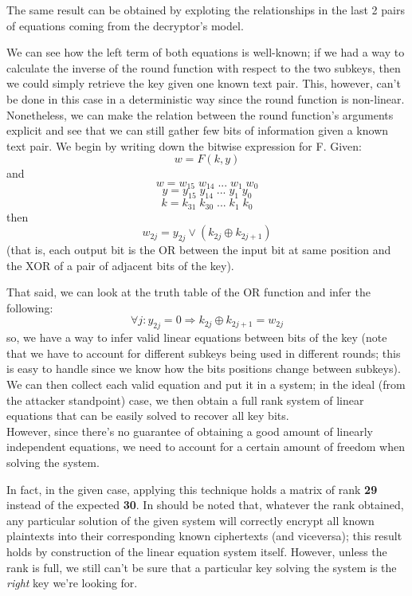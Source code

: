 \documentclass[a4paper,12pt,titlepage]{article}
\begin{document}
The same result can be obtained by exploting the relationships in the last 2
pairs of equations coming from the decryptor's model.

We can see how the left term of both equations is well-known; if we had a way
to calculate the inverse of the round function with respect to the two subkeys,
then we could simply retrieve the key given one known text pair. This, however,
can't be done in this case in a deterministic way since the round function is
non-linear. Nonetheless, we can make the relation between the round function's
arguments explicit and see that we can still gather few bits of information
given a known text pair. We begin by writing down the bitwise expression for F.
Given:
\[w = F(k, y)\]
and
\[w = w_{15} \; w_{14} \; ... \; w_1 \; w_0\]
\[y = y_{15} \; y_{14} \; ... \; y_1 \; y_0\]
\[k = k_{31} \; k_{30} \; ... \; k_1 \; k_0\]
then
\[w_{2j} = y_{2j} \vee (k_{2j} \oplus k_{2j+1})\]
(that is, each output bit is the OR between the input bit at same position and
the XOR of a pair of adjacent bits of the key).

That said, we can look at the truth table of the OR function and infer the
following:
\[\forall j : y_{2j} = 0 \Rightarrow k_{2j} \oplus k_{2j+1} = w_{2j}\]
so, we have a way to infer valid linear equations between bits of the key (note
that we have to account for different subkeys being used in different rounds;
this is easy to handle since we know how the bits positions change between
subkeys). \\
We can then collect each valid equation and put it in a system; in the ideal (from
the attacker standpoint) case, we then obtain a full rank system of linear
equations that can be easily solved to recover all key bits. \\
However, since there's no guarantee of obtaining a good amount of linearly
independent equations, we need to account for a certain amount of freedom when
solving the system.

In fact, in the given case, applying this technique holds a matrix of rank
\textbf{29} instead of the expected \textbf{30}. In should be noted that,
whatever the rank obtained, any particular solution of the given system will
correctly encrypt all known plaintexts into their corresponding known
ciphertexts (and viceversa); this result holds by construction of the linear
equation system itself. However, unless the rank is full, we still can't be sure
that a particular key solving the system is the \emph{right} key we're looking
for. \\
\end{document}

